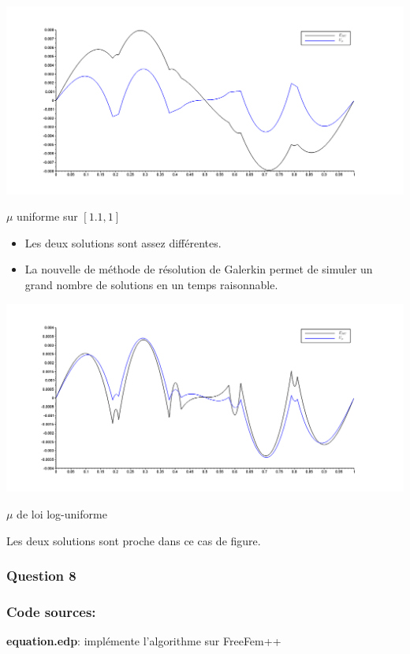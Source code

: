 \documentclass{article}
\newcommand{\Q}[1]{\subsubsection*{Question #1}}
\newcommand{\Code}[2]{\textbf{#1}: #2\\}
\newcommand{\Source}[0]{\subsubsection*{Code sources:}}
\begin{document}
\begin{center}
\includegraphics[scale=0.25]{img/q7-1.png}

$\mu$ uniforme sur $[1.1, 1]$
\end{center}
\begin{itemize}
	\item Les deux solutions sont assez différentes. 
	\item La nouvelle de méthode de résolution de Galerkin permet de simuler un grand nombre de solutions en un temps raisonnable.
\end{itemize}
\begin{center}
\includegraphics[scale=0.25]{img/q7-2.png}

$\mu$ de loi log-uniforme
\end{center}
Les deux solutions sont proche dans ce cas de figure. 



\Q{8}
\Source
\Code{equation.edp}{implémente l'algorithme sur FreeFem++ }
\end{document}
